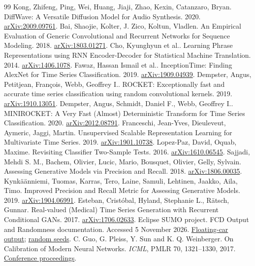 \begin{thebibliography}{99}
 Kong, Zhifeng, Ping, Wei, Huang, Jiaji, Zhao, Kexin, Catanzaro, Bryan. DiffWave: A Versatile Diffusion Model for Audio Synthesis. 2020. \href{https://arxiv.org/abs/2009.09761}{arXiv:2009.09761}.
 Bai, Shaojie, Kolter, J. Zico, Koltun, Vladlen. An Empirical Evaluation of Generic Convolutional and Recurrent Networks for Sequence Modeling. 2018. \href{https://arxiv.org/abs/1803.01271}{arXiv:1803.01271}.
 Cho, Kyunghyun et al.. Learning Phrase Representations using RNN Encoder-Decoder for Statistical Machine Translation. 2014. \href{https://arxiv.org/abs/1406.1078}{arXiv:1406.1078}.
 Fawaz, Hassan Ismail et al.. InceptionTime: Finding AlexNet for Time Series Classification. 2019. \href{https://arxiv.org/abs/1909.04939}{arXiv:1909.04939}.
 Dempster, Angus, Petitjean, François, Webb, Geoffrey I.. ROCKET: Exceptionally fast and accurate time series classification using random convolutional kernels. 2019. \href{https://arxiv.org/abs/1910.13051}{arXiv:1910.13051}.
 Dempster, Angus, Schmidt, Daniel F., Webb, Geoffrey I.. MINIROCKET: A Very Fast (Almost) Deterministic Transform for Time Series Classification. 2020. \href{https://arxiv.org/abs/2012.08791}{arXiv:2012.08791}.
 Franceschi, Jean-Yves, Dieuleveut, Aymeric, Jaggi, Martin. Unsupervised Scalable Representation Learning for Multivariate Time Series. 2019. \href{https://arxiv.org/abs/1901.10738}{arXiv:1901.10738}.
 Lopez-Paz, David, Oquab, Maxime. Revisiting Classifier Two-Sample Tests. 2016. \href{https://arxiv.org/abs/1610.06545}{arXiv:1610.06545}.
 Sajjadi, Mehdi S. M., Bachem, Olivier, Lucic, Mario, Bousquet, Olivier, Gelly, Sylvain. Assessing Generative Models via Precision and Recall. 2018. \href{https://arxiv.org/abs/1806.00035}{arXiv:1806.00035}.
 Kynkäänniemi, Tuomas, Karras, Tero, Laine, Samuli, Lehtinen, Jaakko, Aila, Timo. Improved Precision and Recall Metric for Assessing Generative Models. 2019. \href{https://arxiv.org/abs/1904.06991}{arXiv:1904.06991}.
 Esteban, Cristóbal, Hyland, Stephanie L., Rätsch, Gunnar. Real-valued (Medical) Time Series Generation with Recurrent Conditional GANs. 2017. \href{https://arxiv.org/abs/1706.02633}{arXiv:1706.02633}.
 Eclipse SUMO project. FCD Output and Randomness documentation. Accessed 5 November 2026. \href{https://sumo.dlr.de/docs/Simulation/Output/FCDOutput.html}{Floating-car output}; \href{https://sumo.dlr.de/docs/Simulation/Randomness.html}{random seeds}.
 C. Guo, G. Pleiss, Y. Sun and K. Q. Weinberger. On Calibration of Modern Neural Networks. \emph{ICML}, PMLR 70, 1321--1330, 2017. \href{https://proceedings.mlr.press/v70/guo17a.html}{Conference proceedings}.

\end{thebibliography}
